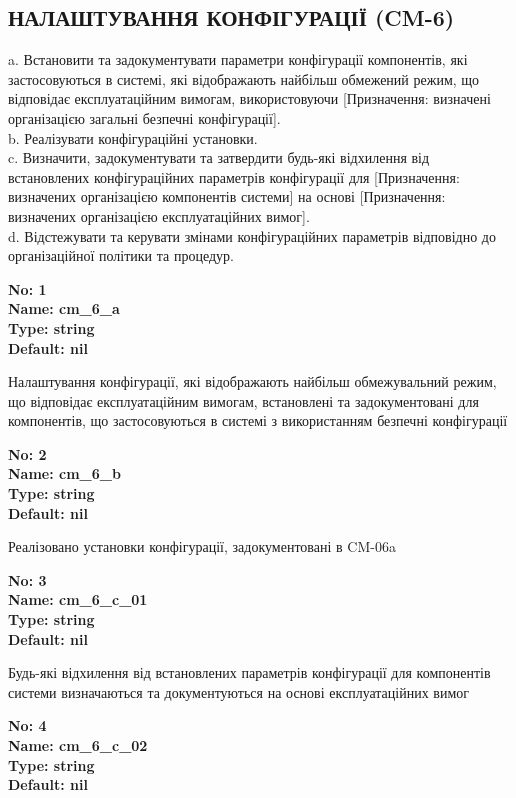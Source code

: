 \documentclass{article}
\begin{document}
\subsection{НАЛАШТУВАННЯ КОНФІГУРАЦІЇ (CM-6)}
a. Встановити та задокументувати параметри конфігурації компонентів, які застосовуються в системі, які відображають найбільш обмежений режим, що відповідає експлуатаційним вимогам, використовуючи [Призначення: визначені організацією загальні безпечні конфігурації].\\ 
b. Реалізувати конфігураційні установки.\\ 
c. Визначити, задокументувати та затвердити будь-які відхилення від встановлених конфігураційних параметрів конфігурації для [Призначення: визначених організацією компонентів системи] на основі [Призначення: визначених організацією експлуатаційних вимог].\\ 
d. Відстежувати та керувати змінами конфігураційних параметрів відповідно до організаційної політики та процедур.

\vspace{10pt}
{\footnotesize\bfseries
No: 1\\
Name: cm\_\allowbreak{}6\_\allowbreak{}a\\
Type: string\\
Default: nil
}

{\footnotesize Налаштування конфігурації, які відображають найбільш обмежувальний режим, що відповідає експлуатаційним вимогам, встановлені та задокументовані для компонентів, що застосовуються в системі з використанням безпечні конфігурації}


{\footnotesize\bfseries
No: 2\\
Name: cm\_\allowbreak{}6\_\allowbreak{}b\\
Type: string\\
Default: nil
}

{\footnotesize Реалізовано установки конфігурації, задокументовані в CM-06a}


{\footnotesize\bfseries
No: 3\\
Name: cm\_\allowbreak{}6\_\allowbreak{}c\_\allowbreak{}01\\
Type: string\\
Default: nil
}

{\footnotesize Будь-які відхилення від встановлених параметрів конфігурації для компонентів системи визначаються та документуються на основі експлуатаційних вимог}


{\footnotesize\bfseries
No: 4\\
Name: cm\_\allowbreak{}6\_\allowbreak{}c\_\allowbreak{}02\\
Type: string\\
Default: nil
}
\end{document}
